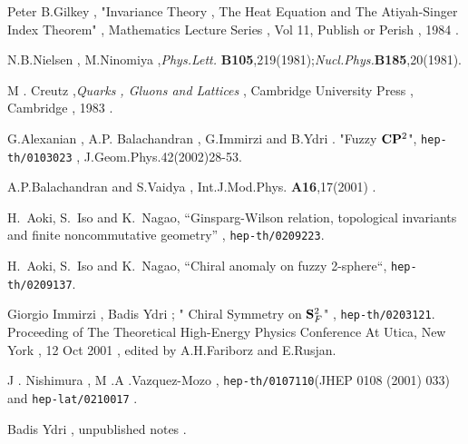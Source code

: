 \documentclass[a4paper,10pt]{article}
\begin{document}
\begin{thebibliography}{99}
Peter B.Gilkey , "Invariance Theory , The Heat Equation and The Atiyah-Singer Index Theorem" , Mathematics Lecture
Series , Vol 11, Publish or Perish , 1984 .



N.B.Nielsen , M.Ninomiya ,{\em Phys.Lett.}{\bf
B105},219(1981);{\em Nucl.Phys.}{\bf B185},20(1981).

M . Creutz ,{\em Quarks , Gluons and Lattices} , Cambridge
University Press , Cambridge , 1983 .

G.Alexanian , A.P. Balachandran , G.Immirzi and B.Ydri . "Fuzzy
${\bf C}{\bf P}^{2}$", {\tt hep-th/0103023} ,
J.Geom.Phys.42(2002)28-53.

A.P.Balachandran and S.Vaidya , Int.J.Mod.Phys.{\bf
A16},17(2001) .

H.~Aoki, S.~Iso and K.~Nagao,
``Ginsparg-Wilson relation, topological invariants and finite 
noncommutative geometry'' , {\tt hep-th/0209223}.


H.~Aoki, S.~Iso and K.~Nagao, ``Chiral anomaly on fuzzy 2-sphere``, {\tt hep-th/0209137}.


Giorgio Immirzi , Badis Ydri ; " Chiral Symmetry on ${\bf
S}^2_F$" , {\tt hep-th/0203121}. Proceeding of The Theoretical
High-Energy Physics Conference At Utica, New York , 12 Oct 2001 ,
edited by A.H.Fariborz and E.Rusjan.

J . Nishimura  , M .A .Vazquez-Mozo ,  {\tt hep-th/0107110}(JHEP 0108 (2001) 033) and  {\tt hep-lat/0210017} .

Badis Ydri , unpublished notes .


\end{thebibliography}
\end{document}
